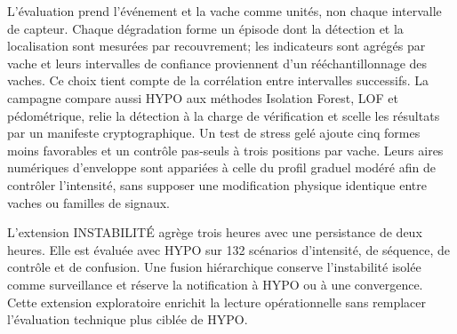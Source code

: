 \begin{introduction}
L'évaluation prend l'événement et la vache comme unités, non chaque intervalle de capteur. Chaque
dégradation forme un épisode dont la détection et la localisation sont mesurées par recouvrement;
les indicateurs sont agrégés par vache et leurs intervalles de confiance proviennent d'un
rééchantillonnage des vaches. Ce choix tient compte de la corrélation entre intervalles successifs.
La campagne compare aussi HYPO aux méthodes Isolation Forest, LOF et pédométrique, relie la
détection à la charge de vérification et scelle les résultats par un manifeste cryptographique.
Un test de stress gelé ajoute cinq formes moins favorables et un contrôle pas-seuls à trois positions
par vache. Leurs aires numériques d'enveloppe sont appariées à celle du profil graduel modéré afin
de contrôler l'intensité, sans supposer une modification physique identique entre vaches ou
familles de signaux.

L'extension INSTABILITÉ agrège trois heures avec une persistance de deux heures. Elle est évaluée
avec HYPO sur 132 scénarios d'intensité, de séquence, de contrôle et de confusion. Une fusion
hiérarchique conserve l'instabilité isolée comme surveillance et réserve la notification à HYPO
ou à une convergence. Cette extension exploratoire enrichit la lecture opérationnelle sans
remplacer l'évaluation technique plus ciblée de HYPO.


\end{introduction}
